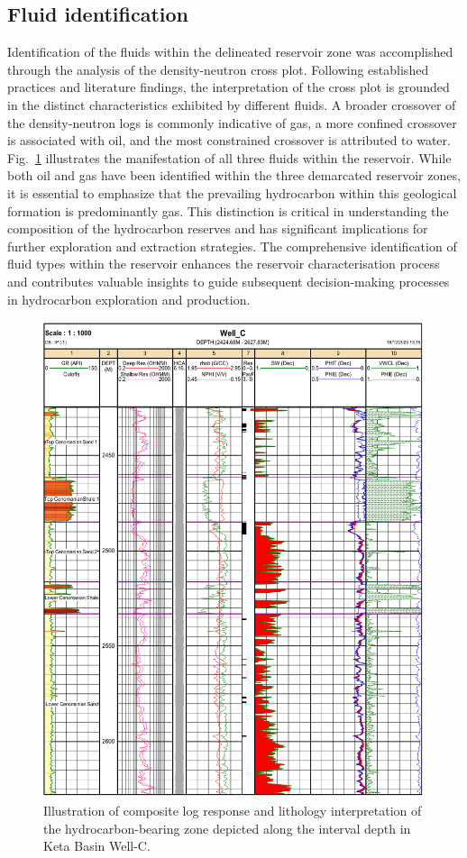 \documentclass{gji}
\begin{document}
\subsection{Fluid identification } \label{subsec:Rfd}

Identification of the fluids within the delineated reservoir zone was accomplished through the analysis of the density-neutron cross plot. 
Following established practices and literature findings, the interpretation of the cross plot is grounded in the distinct characteristics exhibited by different fluids. 
A broader crossover of the density-neutron logs is commonly indicative of gas, a more confined crossover is associated with oil, and the most constrained crossover is attributed to water.
Fig.~\ref{fig:petro3} illustrates the manifestation of all three fluids within the reservoir.
While both oil and gas have been identified within the three demarcated reservoir zones, it is essential to emphasize that the prevailing hydrocarbon within this geological formation is predominantly gas.
This distinction is critical in understanding the composition of the hydrocarbon reserves and has significant implications for further exploration and extraction strategies. 
The comprehensive identification of fluid types within the reservoir enhances the reservoir characterisation process and contributes valuable insights to guide subsequent decision-making processes in hydrocarbon exploration and production.
%
%
\begin{figure}%
    \centering    \includegraphics[width=\textwidth]{GP} %
   \caption{Illustration of composite log response and lithology interpretation of the hydrocarbon-bearing zone depicted along the interval depth in Keta Basin Well-C.}\label{fig:petro3}     
\end{figure}
\end{document}
